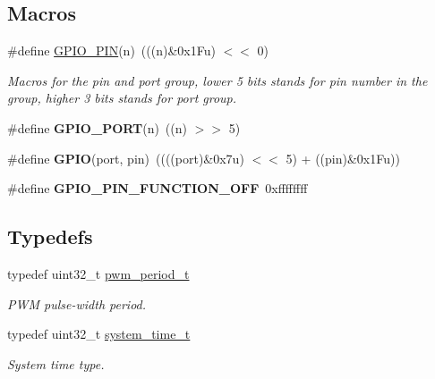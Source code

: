 \subsection*{Macros}
\begin{DoxyCompactItemize}
\item 
\mbox{\label{group___h_p_l_ga50e2e0aca2b651e066ebc5aeb5fdad25}} 
\#define \hyperlink{group___h_p_l_ga50e2e0aca2b651e066ebc5aeb5fdad25}{G\+P\+I\+O\+\_\+\+P\+IN}(n)~(((n)\&0x1\+Fu) $<$$<$ 0)
\begin{DoxyCompactList}\small\item\em Macros for the pin and port group, lower 5 bits stands for pin number in the group, higher 3 bits stands for port group. \end{DoxyCompactList}\item 
\mbox{\label{group___h_p_l_ga9797315af6a0aa3291bb73648a3b1379}} 
\#define {\bfseries G\+P\+I\+O\+\_\+\+P\+O\+RT}(n)~((n) $>$$>$ 5)
\item 
\mbox{\label{group___h_p_l_gaf065b9160b968f60a562bdc5c4454a5a}} 
\#define {\bfseries G\+P\+IO}(port,  pin)~((((port)\&0x7u) $<$$<$ 5) + ((pin)\&0x1\+Fu))
\item 
\mbox{\label{group___h_p_l_ga4ac520942c3dfa92e76b896518718576}} 
\#define {\bfseries G\+P\+I\+O\+\_\+\+P\+I\+N\+\_\+\+F\+U\+N\+C\+T\+I\+O\+N\+\_\+\+O\+FF}~0xffffffff
\end{DoxyCompactItemize}
\subsection*{Typedefs}
\begin{DoxyCompactItemize}
\item 
\mbox{\label{group___h_p_l_ga54b3c18a071fea0c56652e887810b3f6}} 
typedef uint32\+\_\+t \hyperlink{group___h_p_l_ga54b3c18a071fea0c56652e887810b3f6}{pwm\+\_\+period\+\_\+t}
\begin{DoxyCompactList}\small\item\em P\+WM pulse-\/width period. \end{DoxyCompactList}\item 
\mbox{\label{group___h_p_l_ga5885ba48297c95f5c8a108cfa02e6e55}} 
typedef uint32\+\_\+t \hyperlink{group___h_p_l_ga5885ba48297c95f5c8a108cfa02e6e55}{system\+\_\+time\+\_\+t}
\begin{DoxyCompactList}\small\item\em System time type. \end{DoxyCompactList}\end{DoxyCompactItemize}
